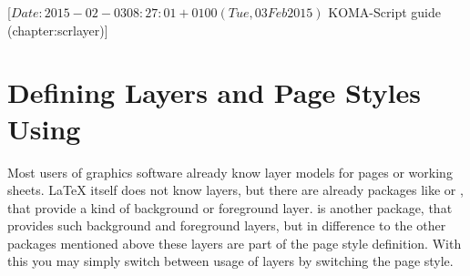 %
%
%
%
%
%
%
%
% 
%
%
%
%

                 [$Date: 2015-02-03 08:27:01 +0100 (Tue, 03 Feb 2015) $
                  KOMA-Script guide (chapter:scrlayer)]



\chapter[{Defining Layers and Page Styles Using \Package{scrlayer}}]%
{Defining Layers and Page Styles Using %
}

%
%
Most users of graphics software already know layer models for pages or working
sheets. \LaTeX{} itself does not know layers, but there are already packages
like  or , that provide a kind of
background or foreground layer.  is another package,
that provides such background and foreground layers, but in difference
to the other packages mentioned above these layers are part of the
page style definition. With this you may simply switch between usage
of layers by switching the page style.

